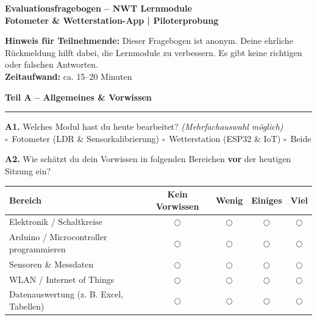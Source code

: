 \documentclass[a4paper,10pt]{article}
\newcommand{\radio}{\textsf{\Large$\bigcirc$}}
\newcommand{\checkbox}{\textsf{\Large$\square$}}
\begin{document}
{\Large \bfseries \color{primary} Evaluationsfragebogen – NWT Lernmodule}\\[2pt]
{\large \bfseries \color{accent} Fotometer \& Wetterstation-App | Piloterprobung}\\[8pt]

\begin{tcolorbox}[colback=lightgray,colframe=accent,arc=2mm,boxrule=1pt,top=6pt,bottom=6pt,left=8pt,right=8pt]
\textbf{Hinweis für Teilnehmende:} Dieser Fragebogen ist anonym. Deine ehrliche Rückmeldung hilft dabei, die Lernmodule zu verbessern. Es gibt keine richtigen oder falschen Antworten.\\[2pt]
\textbf{Zeitaufwand:} ca. 15–20 Minuten
\end{tcolorbox}

\vspace{4pt}

{\large \bfseries \color{primary} Teil A – Allgemeines \& Vorwissen}\\[-4pt]
\color{accent}\rule{\linewidth}{1.5pt}\color{black}\vspace{4pt}

\textbf{A1.} Welches Modul hast du heute bearbeitet? \textit{(Mehrfachauswahl möglich)}\\[4pt]
\checkbox~Fotometer (LDR \& Sensorkalibrierung) \quad 
\checkbox~Wetterstation (ESP32 \& IoT) \quad 
\checkbox~Beide

\vspace{8pt}

\textbf{A2.} Wie schätzt du dein Vorwissen in folgenden Bereichen \textbf{vor} der heutigen Sitzung ein?\\[4pt]
\begin{tabularx}{\linewidth}{X c c c c}
\toprule
\textbf{Bereich} & \textbf{Kein Vorwissen} & \textbf{Wenig} & \textbf{Einiges} & \textbf{Viel} \\
\midrule
Elektronik / Schaltkreise & \radio & \radio & \radio & \radio \\
Arduino / Microcontroller programmieren & \radio & \radio & \radio & \radio \\
Sensoren \& Messdaten & \radio & \radio & \radio & \radio \\
WLAN / Internet of Things & \radio & \radio & \radio & \radio \\
Datenauswertung (z. B. Excel, Tabellen) & \radio & \radio & \radio & \radio \\
\bottomrule
\end{tabularx}
\end{document}
